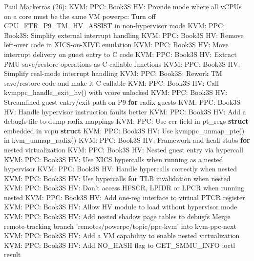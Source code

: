 \documentclass[landscape, 14pt]{report}
\newenvironment{Shaded}{}{}
\newcommand{\KeywordTok}[1]{\textcolor[rgb]{0.00,0.44,0.13}{\textbf{#1}}}
\newcommand{\DataTypeTok}[1]{\textcolor[rgb]{0.56,0.13,0.00}{#1}}
\newcommand{\DecValTok}[1]{\textcolor[rgb]{0.25,0.63,0.44}{#1}}
\newcommand{\ControlFlowTok}[1]{\textcolor[rgb]{0.00,0.44,0.13}{\textbf{#1}}}
\newcommand{\NormalTok}[1]{#1}
\begin{document}
\begin{Shaded}
\begin{Highlighting}[]
\NormalTok{Paul Mackerras (}\DecValTok{26}\NormalTok{):}
\NormalTok{      KVM: PPC: Book3S HV: Provide mode where all vCPUs on a core must be the same VM}
\NormalTok{      powerpc: Turn off CPU_FTR_P9_TM_HV_ASSIST in non-hypervisor mode}
\NormalTok{      KVM: PPC: Book3S: Simplify external interrupt handling}
\NormalTok{      KVM: PPC: Book3S HV: Remove left-over code in XICS-on-XIVE emulation}
\NormalTok{      KVM: PPC: Book3S HV: Move interrupt delivery on guest entry to C code}
\NormalTok{      KVM: PPC: Book3S HV: Extract PMU save/restore operations as C-callable functions}
\NormalTok{      KVM: PPC: Book3S HV: Simplify real-mode interrupt handling}
\NormalTok{      KVM: PPC: Book3S: Rework TM save/restore code and make it C-callable}
\NormalTok{      KVM: PPC: Book3S HV: Call kvmppc_handle_exit_hv() with vcore unlocked}
\NormalTok{      KVM: PPC: Book3S HV: Streamlined guest entry/exit path on P9 }\ControlFlowTok{for}\NormalTok{ radix guests}
\NormalTok{      KVM: PPC: Book3S HV: Handle hypervisor instruction faults better}
\NormalTok{      KVM: PPC: Book3S HV: Add a debugfs file to dump radix mappings}
\NormalTok{      KVM: PPC: Use ccr field in pt_regs }\KeywordTok{struct}\NormalTok{ embedded in vcpu }\KeywordTok{struct}
\NormalTok{      KVM: PPC: Book3S HV: Use kvmppc_unmap_pte() in kvm_unmap_radix()}
\NormalTok{      KVM: PPC: Book3S HV: Framework and hcall stubs }\ControlFlowTok{for}\NormalTok{ nested virtualization}
\NormalTok{      KVM: PPC: Book3S HV: Nested guest entry via hypercall}
\NormalTok{      KVM: PPC: Book3S HV: Use XICS hypercalls when running as a nested hypervisor}
\NormalTok{      KVM: PPC: Book3S HV: Handle hypercalls correctly when nested}
\NormalTok{      KVM: PPC: Book3S HV: Use hypercalls }\ControlFlowTok{for}\NormalTok{ TLB invalidation when nested}
\NormalTok{      KVM: PPC: Book3S HV: Don't access HFSCR, LPIDR or LPCR when running nested}
\NormalTok{      KVM: PPC: Book3S HV: Add one-reg interface to virtual PTCR }\DataTypeTok{register}
\NormalTok{      KVM: PPC: Book3S HV: Allow HV module to load without hypervisor mode}
\NormalTok{      KVM: PPC: Book3S HV: Add nested shadow page tables to debugfs}
\NormalTok{      Merge remote-tracking branch 'remotes/powerpc/topic/ppc-kvm' into kvm-ppc-next}
\NormalTok{      KVM: PPC: Book3S HV: Add a VM capability to enable nested virtualization}
\NormalTok{      KVM: PPC: Book3S HV: Add NO_HASH flag to GET_SMMU_INFO ioctl result}


\end{Highlighting}
\end{Shaded}
\end{document}
